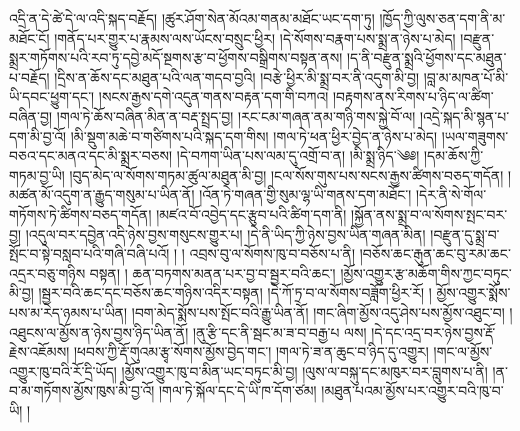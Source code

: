 འདྲི་ན་དེ་ཚེ་དེ་ལ་འདི་སྐད་བརྗོད། །ཚུར་ཤོག་སེན་མོའམ་གནམ་མཐོང་ཡང་དག་ཏུ། །ཁྱོད་ཀྱི་ལུས་ཅན་དག་ནི་མ་མཐོང་ངོ། །གནོད་པར་གྱུར་པ་རྣམས་ལས་ཡོངས་བསྲུང་ཕྱིར། །དེ་སོགས་བརྣག་པས་སྨྲ་ན་ཉེས་པ་མེད། །བརྫུན་སྨྲར་གཏོགས་པའི་རབ་ཏུ་དབྱེ་མདོ་སྔགས་རྩ་བ་ཕྱོགས་བསྒྲིགས་བསྟན་ནས། །ད་ནི་བརྫུན་སྨྲའི་ཕྱོགས་དང་མཐུན་པ་བརྗོད། །དྲིས་ན་ཆོས་དང་མཐུན་པའི་ལན་གདབ་བྱའི། །བརྩེ་ཕྱིར་མི་སྨྲ་བར་ནི་འདུག་མི་བྱ། །བླ་མ་མཁན་པོ་མི་ཡི་དབང་ཕྱུག་དང་། །སངས་རྒྱས་དགེ་འདུན་གནས་བརྟན་དག་གི་བཀའ། །བརྟགས་ནས་རིགས་པ་ཉིད་ལ་ཚིག་བཞིན་བྱ། །གལ་ཏེ་ཆོས་བཞིན་མིན་ན་བརྡ་སྤྲད་བྱ། །རང་ངམ་གཞན་ནམ་གཉི་གས་སྐྱེ་བོ་ལ། །འདྲེ་སྐད་མི་སྙན་པ་དག་མི་བྱ་འོ། །མི་སྡུག་མཆེ་བ་གཙིགས་པའི་སྐད་དག་གིས། །གལ་ཏེ་ཕན་ཕྱིར་བྱེད་ན་ཉེས་པ་མེད། །ཡལ་གཟུགས་བཅའ་དང་མནའ་དང་མི་སྨྲར་བཅས། །དེ་བཀག་ཡིན་པས་ལམ་དུ་འགྲོ་བ་ན། །མི་སྨྲ་ཉིད་༄༅། །དམ་ཆོས་ཀྱི་གཏམ་བྱ་ཡི། །བུད་མེད་ལ་སོགས་གཏམ་ཚུལ་མཐུན་མི་བྱ། །ངལ་སོས་གུས་པས་སངས་རྒྱས་ཚིགས་བཅད་གདོན། །མཚན་མོ་འདུག་ན་རྒྱུད་གསུམ་པ་ཡིན་ནོ། །འོན་ཏེ་གཞན་གྱི་སུམ་ལྷ་ཡི་གནས་དག་མཐོང་། །དེར་ནི་སེ་གོལ་གཏོགས་ཏེ་ཚིགས་བཅད་གདོན། །མཛའ་བོ་འབྱེད་དང་རྩུབ་པའི་ཚིག་དག་ནི། །སྐྱོན་ནས་སྨྲ་བ་ལ་སོགས་སྤང་བར་བྱ། །འདུལ་བར་དབྱེན་འདི་ཉེས་བྱས་གསུངས་གྱུར་པ། །དེ་ནི་ཡིད་ཀྱི་ཉེས་བྱས་ཡིན་གཞན་མིན། །བརྫུན་དུ་སྨྲ་བ་སྤོང་བ་སྟེ་བསླབ་པའི་གཞི་བཞི་པའོ། ། ། འབྲས་བུ་ལ་སོགས་ཁུ་བ་བཅོས་པ་ནི། །བཅོས་ཆང་རྒུན་ཆང་བུ་རམ་ཆང་འདྲར་བཅུ་གཉིས བསྟན། ། ཆན་བཏགས་མནན་པར་བྱ་བ་སྦྱར་བའི་ཆང་། །མྱོས་འགྱུར་རྩ་མཆོག་གིས་ཀྱང་བཏུང་མི་བྱ། །སྦྱར་བའི་ཆང་དང་བཅོས་ཆང་གཉིས་འདིར་བསྟན། །དེ་ཀོ་ཏྲ་བ་ལ་སོགས་བཟློག་ཕྱིར་རོ། ། མྱོས་འགྱུར་སྨོས་པས་མ་རེད་ཉམས་པ་ཡིན། །བག་མེད་སྨོས་པས་སྤོང་བའི་རྒྱུ་ཡིན་ནོ། །གང་ཞིག་མྱོས་འདུ་ཤེས་པས་མྱོས་འཐུང་བ། །འཐུངས་ལ་མྱོས་ན་ཉེས་བྱས་ཉིད་ཡིན་ནོ། །ནུ་རྩི་དང་ནི་སྦང་མ་ཟ་བ་བརྒྱ་པ ལས། །དེ་དང་འདྲ་བར་ཉེས་བྱས་རྡོ་རྗེས་འཇོམས། །ཕབས་ཀྱི་རྡོ་གུའམ་རྩྭ་སོགས་མྱོས་བྱེད་གང་། །གལ་ཏེ་ཟ་ན་ཆུང་བ་ཉིད་དུ་འགྱུར། །གང་ལ་མྱོས་འགྱུར་ཁུ་བའི་རོ་དྲི་ཡོད། །མྱོས་འགྱུར་ཁུ་བ་མིན་ཡང་བཏུང་མི་བྱ། །ལུས་ལ་བསྐུ་དང་མཁུར་བར་བླུགས་པ་ནི། །ན་བ་མ་གཏོགས་མྱོས་ཁུས་མི་བྱ་འོ། །གལ་ཏེ་སྐོལ་དང་དེ་ཡི་ཁ་དོག་ཙམ། །མཐུན་པའམ་མྱོས་པར་འགྱུར་བའི་ཁུ་བ་ཡི། །
